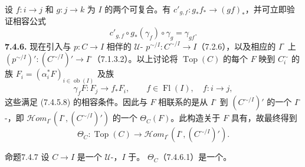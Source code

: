 设 $f:i\to j$ 和 $g:j\to k$ 为 $I$ 的两个可复合。有 $c'_{g,f}:g_*f_*\to(gf)_*$，并可立即验证相容公式
\[c'_{g,f}\circ g_*(\gamma_f)\circ\gamma_g=\gamma_{gf}.\tag{7.4.5.8}\]
\textbf{7.4.6.} 现在引入与 $p:C\to I$ 相伴的 $\mathcal U$- $p^{\sim/I}:C^{\sim/I}\to I$（7.2.6），以及相应的 $I^\circ$ 上 $(p^{\sim/I})':(C^{\sim/I})'\to I^\circ$（7.1.3.2）。以上讨论将 $\operatorname{Top}(C)$ 的每个 $F$ 映到 $C_i^\sim$ 的族 $F_i=(\alpha_i^*F)_{i\in\operatorname{ob}(I)}$ 及族
\[\gamma_fF:F_j\longrightarrow f_*F_i,\qquad f\in\operatorname{Fl}(I),\quad f:i\to j,\]
这些满足 (7.4.5.8) 的相容条件。因此与 $F$ 相联系的是从 $I^\circ$ 到 $(C^{\sim/I})'$ 的一个 $I^\circ$-，即 $\mathscr{H}\!om_{I^\circ}(I^\circ,(C^{\sim/I})')$ 的一个 $\Theta_C(F)$。此构造关于 $F$ 具有，故最终得到
\[\Theta_C:\operatorname{Top}(C)\longrightarrow\mathscr{H}\!om_{I^\circ}(I^\circ,(C^{\sim/I})').\tag{7.4.6.1}\]
\begin{SGAresult}{命题}{7.4.7}
设 $C\to I$ 是一个 $\mathcal U$-，$I$ 于。 $\Theta_C$（7.4.6.1）是一个。
\end{SGAresult}
